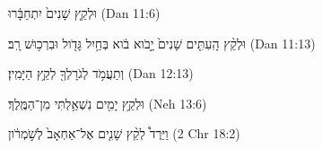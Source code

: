 
\begin{exe}

\ex\label{Lend_sim1}
\texthebrew{
וּלְקֵ֤ץ שָׁנִים֙ יִתְחַבָּ֔רוּ 
} (Dan 11:6)

\ex\label{Lend_sim2}
\texthebrew{
וּלְקֵ֨ץ הָֽעִתִּ֤ים שָׁנִים֙ יָ֣בֹוא בֹ֔וא בְּחַ֥יִל גָּדֹ֖ול וּבִרְכ֥וּשׁ רָֽב׃ 
} (Dan 11:13)

\ex\label{Lend_sim3}
\texthebrew{
וְתַעֲמֹ֥ד לְגֹרָלְךָ֖ לְקֵ֥ץ הַיָּמִֽין׃ 
} (Dan 12:13)

\ex\label{Lend_sim4}
\texthebrew{
וּלְקֵ֥ץ יָמִ֖ים נִשְׁאַ֥לְתִּי מִן־הַמֶּֽלֶךְ׃ 
} (Neh 13:6)

\ex\label{Lend_sim5}
\texthebrew{
וַיֵּרֶד֩ לְקֵ֨ץ שָׁנִ֤ים אֶל־אַחְאָב֙ לְשֹׁ֣מְרֹ֔ון 
} (2 Chr 18:2)

\end{exe}
